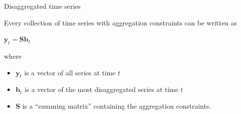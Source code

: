 \documentclass[14pt]{beamer}
\def\by{\bm{y}}
\def\bS{\bm{S}}
\begin{document}







\begin{frame}{\large Disaggregated time series}

Every collection of time series with aggregation constraints can be written as
\begin{block}{}
\centerline{$\by_{t}=\bS\bm{b}_{t}$}
\end{block}
where
\begin{itemize}
\item $\by_t$ is a vector of all series at time $t$
\item $\bm{b}_t$ is a vector of the most disaggregated series at time $t$
\item $\bS$ is a ``summing matrix'' containing the aggregation constraints.
\end{itemize}

\end{frame}
\end{document}
